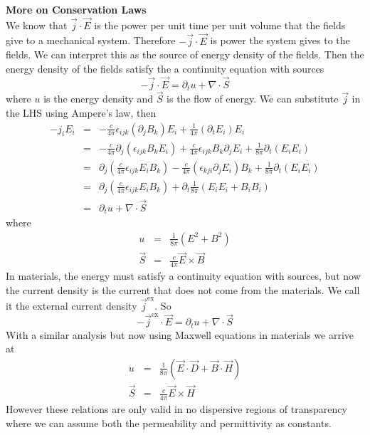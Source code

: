 \documentclass[12pt,a4paper]{article}
\begin{document}
\textbf{More on Conservation Laws}\\
We know that $\vec{j}\cdot \vec{E}$ is the power per unit time per unit volume that the fields give to a mechanical system. Therefore $-\vec{j}\cdot \vec{E}$ is power the system gives to the fields. We can interpret this as the source of energy density of the fields. Then the energy density of the fields satisfy the a continuity equation with sources
\begin{equation}
	-\vec{j}\cdot \vec{E} = \partial_t u + \nabla \cdot \vec{S}
\end{equation}
where $u$ is the energy density and $\vec{S}$ is the flow of energy. We can substitute $\vec{j}$ in the LHS using Ampere's law, then
\begin{eqnarray}
	-j_iE_i & = & -\frac{c}{4\pi}\epsilon_{ijk}(\partial_j B_k)E_i + \frac{1}{4\pi}(\partial_t E_i)E_i \\
	& = & - \frac{c}{4\pi}\partial_j (\epsilon_{ijk}B_k E_i) + \frac{c}{4\pi}\epsilon_{ijk}B_k\partial_j E_i + \frac{1}{8\pi}\partial_{t}(E_iE_i) \\
	& = & \partial_j \left( \frac{c}{4\pi} \epsilon_{ijk}E_i B_k\right) -\frac{c}{4\pi}(\epsilon_{kji}\partial_j E_i)B_k + \frac{1}{8\pi}\partial_t (E_iE_i)\\
	& = & \partial_j \left( \frac{c}{4\pi} \epsilon_{ijk}E_i B_k\right) + \partial_t \frac{1}{8\pi} (E_iE_i + B_iB_i) \\
	& = & \partial_t u + \nabla \cdot \vec{S}
\end{eqnarray}
where
\begin{eqnarray}
	u & = & \frac{1}{8\pi} (E^2 + B^2) \\
	\vec{S} & = & \frac{c}{4\pi}\vec{E} \times \vec{B}
\end{eqnarray}
In materials, the energy must satisfy a continuity equation with sources, but now the current density  is the current that does not come from the materials. We call it the external current density $\vec{j}^{\text{ex}}$. So
\begin{equation}
	-\vec{j}^{\text{ex}}\cdot \vec{E} = \partial_t u + \nabla \cdot \vec{S}
\end{equation}
With a similar analysis but now using Maxwell equations in materials we arrive at
\begin{eqnarray}
	u & = & \frac{1}{8\pi} (\vec{
	E}\cdot\vec{D} + \vec{B}\cdot \vec{H}) \\
	\vec{S} & = & \frac{c}{4\pi}\vec{E} \times \vec{H}
\end{eqnarray}
However these relations are only valid in no dispersive regions of transparency where we can assume both the permeability and permittivity as constants.
\end{document}
